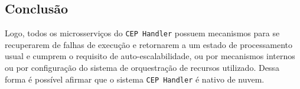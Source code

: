 \subsection{Conclusão}

Logo, todos os microsserviços do \texttt{CEP Handler} possuem mecanismos para se recuperarem de falhas de execução e retornarem a um estado de processamento usual  e cumprem o requisito de auto-escalabilidade, ou por mecanismos internos ou por configuração do sistema de orquestração de recursos utilizado. Dessa forma é possível afirmar que o sistema \texttt{CEP Handler} é nativo de nuvem.





